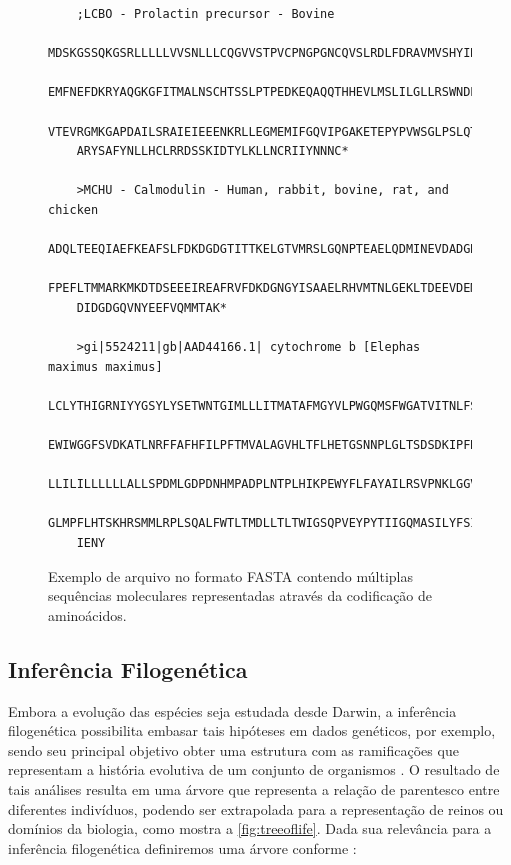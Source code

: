 \documentclass[english,brazilian]{UNISINOSmonografia} %
\newcommand\defaultFigureWidth{0.9}
\begin{document}
\begin{figure}[tb]
\centering%
\begin{minipage}{\defaultFigureWidth\textwidth}
	\caption{Exemplo de arquivo no formato FASTA contendo múltiplas sequências moleculares representadas através da codificação de aminoácidos.}
	\label{fig:arquivo-fasta}
	\begin{footnotesize}
	\begin{verbatim}
	;LCBO - Prolactin precursor - Bovine
	MDSKGSSQKGSRLLLLLVVSNLLLCQGVVSTPVCPNGPGNCQVSLRDLFDRAVMVSHYIHDLSS
	EMFNEFDKRYAQGKGFITMALNSCHTSSLPTPEDKEQAQQTHHEVLMSLILGLLRSWNDPLYHL
	VTEVRGMKGAPDAILSRAIEIEEENKRLLEGMEMIFGQVIPGAKETEPYPVWSGLPSLQTKDED
	ARYSAFYNLLHCLRRDSSKIDTYLKLLNCRIIYNNNC*
	
	>MCHU - Calmodulin - Human, rabbit, bovine, rat, and chicken
	ADQLTEEQIAEFKEAFSLFDKDGDGTITTKELGTVMRSLGQNPTEAELQDMINEVDADGNGTID
	FPEFLTMMARKMKDTDSEEEIREAFRVFDKDGNGYISAAELRHVMTNLGEKLTDEEVDEMIREA
	DIDGDGQVNYEEFVQMMTAK*
	
	>gi|5524211|gb|AAD44166.1| cytochrome b [Elephas maximus maximus]
	LCLYTHIGRNIYYGSYLYSETWNTGIMLLLITMATAFMGYVLPWGQMSFWGATVITNLFSAIPYIGTNLV
	EWIWGGFSVDKATLNRFFAFHFILPFTMVALAGVHLTFLHETGSNNPLGLTSDSDKIPFHPYYTIKDFLG
	LLILILLLLLLALLSPDMLGDPDNHMPADPLNTPLHIKPEWYFLFAYAILRSVPNKLGGVLALFLSIVIL
	GLMPFLHTSKHRSMMLRPLSQALFWTLTMDLLTLTWIGSQPVEYPYTIIGQMASILYFSIILAFLPIAGX
	IENY
	\end{verbatim}
	\end{footnotesize}
\end{minipage}
\end{figure}





\subsection{Inferência Filogenética}
\label{s:phylogeneticinference}



Embora a evolução das espécies seja estudada desde Darwin, a inferência filogenética possibilita embasar tais hipóteses em dados genéticos, por exemplo, sendo seu principal objetivo obter uma estrutura com as ramificações que representam a história evolutiva de um conjunto de organismos \cite{Zwickl2006}.
O resultado de tais análises resulta em uma árvore que representa a relação de parentesco entre diferentes indivíduos, podendo ser extrapolada para a representação de reinos ou domínios da biologia, como mostra a \autoref{fig:treeoflife}.
Dada sua relevância para a inferência filogenética definiremos uma árvore conforme :
\end{document}
